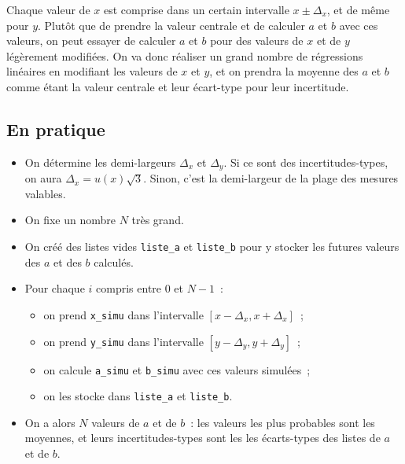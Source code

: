 \documentclass[a4paper, 12pt, garamond]{book}
\begin{document}
Chaque valeur de $x$ est comprise dans un certain intervalle $x \pm \Delta_x$,
et de même pour $y$. Plutôt que de prendre la valeur centrale et de calculer $a$
et $b$ avec ces valeurs, on peut essayer de calculer $a$ et $b$ pour des valeurs
de $x$ et de $y$ légèrement modifiées. On va donc réaliser un grand nombre de
régressions linéaires en modifiant les valeurs de $x$ et $y$, et on prendra la
moyenne des $a$ et $b$ comme étant la valeur centrale et leur écart-type pour
leur incertitude.

\subsection{En pratique}
\begin{itemize}[label=$\diamond$, leftmargin=10pt]
	\item On détermine les demi-largeurs $\Delta_x$ et $\Delta_y$. Si ce sont des
        incertitudes-types, on aura $\Delta_x = u(x)\sqrt{3}$. Sinon, c'est la
        demi-largeur de la plage des mesures valables.
	\item On fixe un nombre $N$ très grand.
	\item On créé des listes vides \texttt{liste\_a} et \texttt{liste\_b} pour y
	      stocker les futures valeurs des $a$ et des $b$ calculés.
	\item Pour chaque $i$ compris entre $0$ et $N-1$~:
	      \begin{itemize}[label=$\triangleright$]
		      \item on prend \texttt{x\_simu} dans l'intervalle $[x-\Delta_x,
					            x+\Delta_x]$~;
		      \item on prend \texttt{y\_simu} dans l'intervalle $[y-\Delta_y,
					            y+\Delta_y]$~;
		      \item on calcule \texttt{a\_simu} et \texttt{b\_simu} avec ces valeurs
		            simulées~;
		      \item on les stocke dans \texttt{liste\_a} et \texttt{liste\_b}.
	      \end{itemize}
	\item On a alors $N$ valeurs de $a$ et de $b$~: les valeurs les plus probables
	      sont les moyennes, et leurs incertitudes-types sont les les écarts-types des
	      listes de $a$ et de $b$.
\end{itemize}
\end{document}
